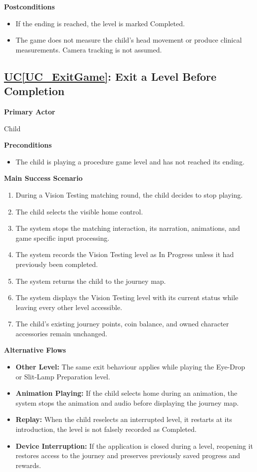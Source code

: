 \documentclass[12pt]{article}
\newcounter{ucnum} %
\newcommand{\ucref}[1]{\hyperref[#1]{UC\ref*{#1}}}
\begin{document}
\textbf{Postconditions}
\begin{itemize}
    \item If the ending is reached, the level is marked Completed.
    \item The game does not measure the child's head movement or
    produce clinical measurements. Camera tracking is not assumed.
\end{itemize}

\label{UC_ExitGame}
\subsection{\ucref{UC_ExitGame}: Exit a Level Before Completion}

\textbf{Primary Actor}

Child

\textbf{Preconditions}
\begin{itemize}
    \item The child is playing a procedure game level and has not
    reached its ending.
\end{itemize}

\textbf{Main Success Scenario}
\begin{enumerate}
    \item During a Vision Testing matching round, the child decides
    to stop playing.
    \item The child selects the visible home control.
    \item The system stops the matching interaction, its narration,
    animations, and game specific input processing.
    \item The system records the Vision Testing level as In Progress
    unless it had previously been completed.
    \item The system returns the child to the journey map.
    \item The system displays the Vision Testing level with its
    current status while leaving every other level accessible.
    \item The child's existing journey points, coin balance, and
    owned character accessories remain unchanged.
\end{enumerate}

\textbf{Alternative Flows}
\begin{itemize}
    \item \textbf{Other Level:} The same exit behaviour applies while
    playing the Eye-Drop or Slit-Lamp Preparation level.
    \item \textbf{Animation Playing:} If the child selects home during
    an animation, the system stops the animation and audio before
    displaying the journey map.
    \item \textbf{Replay:} When the child reselects an interrupted
    level, it restarts at its introduction, the level is not
    falsely recorded as Completed.
    \item \textbf{Device Interruption:} If the application is closed
    during a level, reopening it restores access to the journey
    and preserves previously saved progress and rewards.
\end{itemize}
\end{document}
